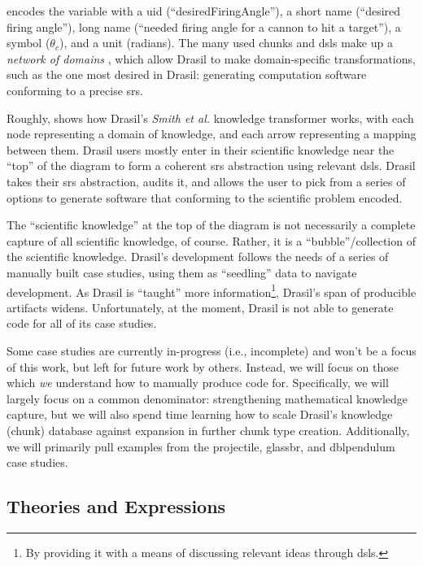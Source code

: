 \exampleAngleVariableEncoding{}

 encodes the variable with a \acs{uid}
(``desiredFiringAngle''), a short name (``desired firing angle''), long name
(``needed firing angle for a cannon to hit a target''), a symbol
(\(\theta{}_{c}\)), and a unit (radians). The many used chunks and \acsp{dsl}
make up a \textit{network of domains} \cite{Czarnecki2005}, which allow Drasil
to make domain-specific transformations, such as the one most desired in Drasil:
generating computation software conforming to a precise \acs{srs}.

\roughNetworkOfDomainsIntro{}

Roughly,  shows how Drasil's \textit{Smith et
      al.} knowledge transformer works, with each node representing a domain of
knowledge, and each arrow representing a mapping between them. Drasil users
mostly enter in their scientific knowledge near the ``top'' of the diagram to
form a coherent \acs{srs} abstraction using relevant \acsp{dsl}. Drasil takes
their \acs{srs} abstraction, audits it, and allows the user to pick from a
series of options to generate software that conforming to the scientific problem
encoded.

The ``scientific knowledge'' at the top of the diagram is not necessarily a
complete capture of all scientific knowledge, of course. Rather, it is a
``bubble''/collection of the scientific knowledge. Drasil's development follows
the needs of a series of manually built case studies, using them as ``seedling''
data to navigate development. As Drasil is ``taught'' more
information\footnote{By providing it with a means of discussing relevant ideas
      through \acsp{dsl}.}, Drasil's span of producible artifacts widens.
Unfortunately, at the moment, Drasil is not able to generate code for all of its
case studies.

Some case studies are currently in-progress (i.e., incomplete) and won't be a
focus of this work, but left for future work by others. Instead, we will focus
on those which \textit{we} understand how to manually produce code for.
Specifically, we will largely focus on a common denominator: strengthening
mathematical knowledge capture, but we will also spend time learning how to
scale Drasil's knowledge (chunk) database against expansion in further chunk
type creation. Additionally, we will primarily pull examples from the
\acs{projectile}, \acs{glassbr}, and \acs{dblpendulum} case studies.

\subsection{Theories and Expressions}
\label{chap:intro:sec:drasil:subsec:theories-and-expressions}

